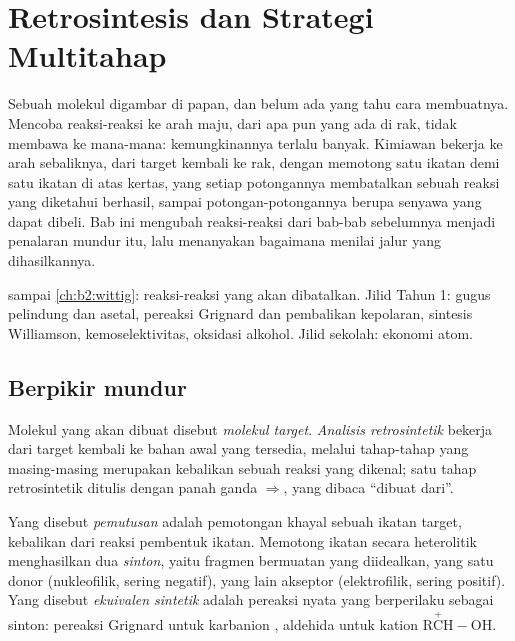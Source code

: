 \chapter{Retrosintesis dan Strategi Multitahap}\label{ch:b2:retrosynthesis}

Sebuah molekul digambar di papan, dan belum ada yang tahu cara membuatnya.
Mencoba reaksi-reaksi ke arah maju, dari apa pun yang ada di rak, tidak
membawa ke mana-mana: kemungkinannya terlalu banyak. Kimiawan bekerja ke
arah sebaliknya, dari target kembali ke rak, dengan memotong satu ikatan
demi satu ikatan di atas kertas, yang setiap potongannya membatalkan sebuah
reaksi yang diketahui berhasil, sampai potongan-potongannya berupa senyawa
yang dapat dibeli. Bab ini mengubah reaksi-reaksi dari bab-bab sebelumnya
menjadi penalaran mundur itu, lalu menanyakan bagaimana menilai jalur yang
dihasilkannya.

\begin{recall}
 sampai \cref{ch:b2:wittig}: reaksi-reaksi yang
akan dibatalkan. Jilid Tahun 1: gugus pelindung dan asetal, pereaksi
Grignard dan pembalikan kepolaran, sintesis Williamson, kemoselektivitas,
oksidasi alkohol. Jilid sekolah: ekonomi atom.
\end{recall}

\section{Berpikir mundur}

\begin{definition}\label{def:b2:retrosynthesis:analysis}
Molekul yang akan dibuat disebut \emph{molekul target}. \emph{Analisis retrosintetik}
 bekerja dari target kembali ke bahan awal
yang tersedia, melalui tahap-tahap yang masing-masing merupakan kebalikan
sebuah reaksi yang dikenal; satu tahap retrosintetik ditulis dengan panah
ganda $\Rightarrow$, yang dibaca ``dibuat dari''.
\end{definition}

\begin{definition}\label{def:b2:retrosynthesis:disconnection}
Yang disebut \emph{pemutusan} adalah pemotongan khayal
sebuah ikatan target, kebalikan dari reaksi pembentuk ikatan. Memotong
ikatan secara heterolitik menghasilkan dua \emph{sinton},
yaitu fragmen bermuatan yang diidealkan, yang satu donor (nukleofilik,
sering negatif), yang lain akseptor (elektrofilik, sering positif). Yang
disebut \emph{ekuivalen sintetik} adalah pereaksi
nyata yang berperilaku sebagai sinton: pereaksi Grignard untuk karbanion
, aldehida untuk kation $\mathrm{R\overset{+}{C}H{-}OH}$.
\end{definition}

